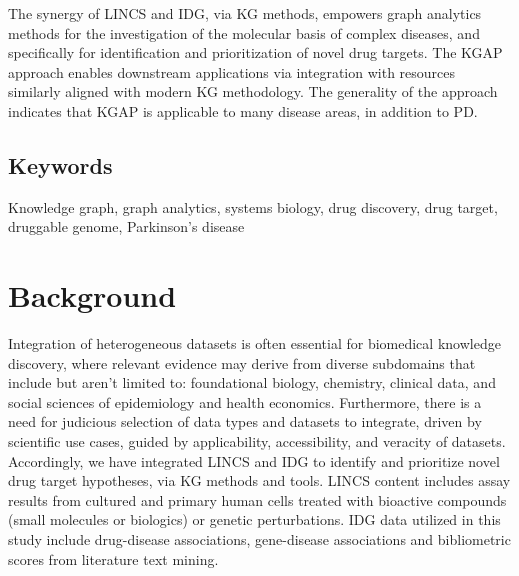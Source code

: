 The synergy of LINCS and IDG, via KG methods, empowers graph analytics methods for the investigation of the molecular basis of complex diseases, and specifically for identification and prioritization of novel drug targets. The KGAP approach enables downstream applications via integration with resources similarly aligned with modern KG methodology. The generality of the approach indicates that KGAP is applicable to many disease areas, in addition to PD.

\subsection{Keywords}
Knowledge graph, graph analytics, systems biology, drug discovery, drug target, druggable genome, Parkinson's disease

\section{Background}

Integration of heterogeneous datasets is often essential for biomedical knowledge discovery, where relevant evidence may derive from diverse subdomains that include but aren't limited to: foundational biology, chemistry, clinical data, and social sciences of epidemiology and health economics. Furthermore, there is a need for judicious selection of data types and datasets to integrate, driven by scientific use cases, guided by applicability, accessibility, and veracity of datasets. Accordingly, we have integrated LINCS and IDG to identify and prioritize novel drug target hypotheses, via KG methods and tools. LINCS content includes assay results from cultured and primary human cells treated with bioactive compounds (small molecules or biologics) or genetic perturbations. IDG data utilized in this study include drug-disease associations, gene-disease associations and bibliometric scores from literature text mining.


